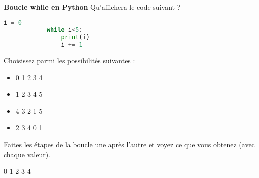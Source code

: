     
    \begin{Exercice}[5 minutes] \textbf{Boucle while en Python}
      	Qu'affichera le code suivant ?
      	
      	\begin{lstlisting}[language=Python]
                i = 0
    		while i<5:
        		print(i)
        		i += 1
        		 \end{lstlisting}
             	
        Choisissez parmi les possibilités suivantes :
        
        \begin{itemize}
        
        \item 0 
        1 
        2 
        3 
        4 
        \item 1  
        2 
        3 
        4 
        5 
        \item 4 
        3 
        2 
        1 
        5 
        \item 2 
        3 
        4 
        0 
        1
        \end{itemize}
    
        \begin{conseil}
		   Faites les étapes de la boucle une après l'autre et voyez ce que vous obtenez (avec chaque valeur).  
        \end{conseil}
        
        \begin{solution}
            0 
            1 
            2 
            3 
            4
        \end{solution}
    \end{Exercice}
    
